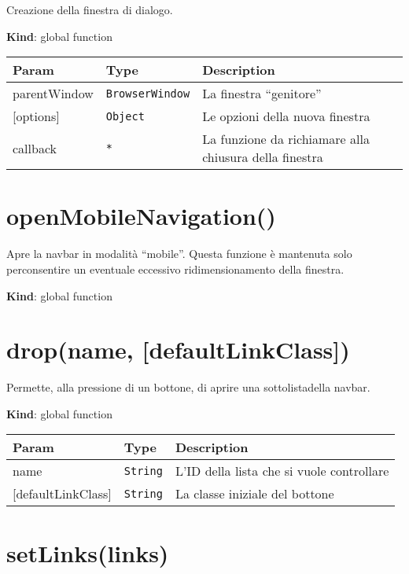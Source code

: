 Creazione della finestra di dialogo.

\textbf{Kind}: global function

\begin{longtabu} to \textwidth {X[1,L,m]X[1,L,m]X[1.5,L,m]}
\toprule
Param & Type & Description\tabularnewline
\midrule
\endhead
parentWindow & \texttt{BrowserWindow} & La finestra
``genitore''\tabularnewline
{[}options{]} & \texttt{Object} & Le opzioni della nuova
finestra\tabularnewline
callback & \texttt{*} & La funzione da richiamare alla chiusura della
finestra\tabularnewline
\bottomrule
\end{longtabu}

\protect\hypertarget{openMobileNavigation}{}{}

\hypertarget{openmobilenavigation}{%
\section{openMobileNavigation()}\label{openmobilenavigation}}

Apre la navbar in modalità ``mobile''. Questa funzione è mantenuta solo
perconsentire un eventuale eccessivo ridimensionamento della finestra.

\textbf{Kind}: global function\\
\protect\hypertarget{drop}{}{}

\hypertarget{dropname-defaultlinkclass}{%
\section{drop(name,
{[}defaultLinkClass{]})}\label{dropname-defaultlinkclass}}

Permette, alla pressione di un bottone, di aprire una sottolistadella
navbar.

\textbf{Kind}: global function

\begin{longtabu} to \textwidth {X[1,L,m]X[1,L,m]X[1.5,L,m]}
\toprule
Param & Type & Description\tabularnewline
\midrule
\endhead
name & \texttt{String} & L'ID della lista che si vuole
controllare\tabularnewline
{[}defaultLinkClass{]} & \texttt{String} & La classe iniziale del
bottone\tabularnewline
\bottomrule
\end{longtabu}

\protect\hypertarget{setLinks}{}{}

\hypertarget{setlinkslinks}{%
\section{setLinks(links)}\label{setlinkslinks}}

